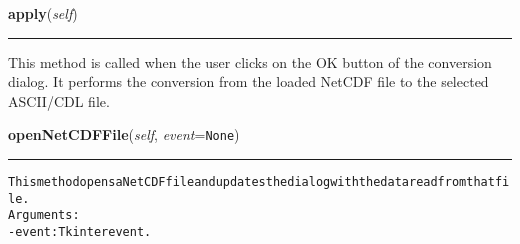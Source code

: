     \vspace{0.5ex}

\hspace{.8\funcindent}\begin{boxedminipage}{\funcwidth}

    \raggedright \textbf{apply}(\textit{self})

    \vspace{-1.5ex}

    \rule{\textwidth}{0.5\fboxrule}
\setlength{\parskip}{2ex}
    This method is called when the user clicks on the OK button of the 
    conversion dialog. It performs the conversion from the loaded NetCDF 
    file to the selected ASCII/CDL file.

\setlength{\parskip}{1ex}
    \end{boxedminipage}

    \label{nMOLDYN:GUI:NetCDFToASCIIConversionDialog:NetCDFToASCIIConversionDialog:openNetCDFFile}

    \vspace{0.5ex}

\hspace{.8\funcindent}\begin{boxedminipage}{\funcwidth}

    \raggedright \textbf{openNetCDFFile}(\textit{self}, \textit{event}={\tt None})

    \vspace{-1.5ex}

    \rule{\textwidth}{0.5\fboxrule}
\setlength{\parskip}{2ex}
\begin{alltt}

This method opens a NetCDF file and updates the dialog with the data read from that file.
Arguments:
    -event: Tkinter event.
\end{alltt}

\setlength{\parskip}{1ex}
    \end{boxedminipage}

    \label{nMOLDYN:GUI:NetCDFToASCIIConversionDialog:NetCDFToASCIIConversionDialog:selectVariable}

